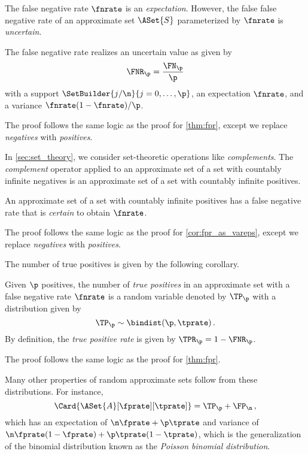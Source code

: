 \documentclass[ ../main.tex]{subfiles}
\begin{document}
The false negative rate $\fnrate$ is an \emph{expectation}.
However, the false false negative rate of an approximate set $\ASet{S}$ parameterized by $\fnrate$ is \emph{uncertain}.
\begin{theorem}
\label{thm:fnr}
The false negative rate realizes an uncertain value as given by
\begin{equation}
    \FNR_\p = \frac{\FN_\p}{\p}
\end{equation}
with a support $\SetBuilder{j / \n}{j = 0,\ldots,\p}$, an expectation 
$\fnrate$, 
and a variance $\fnrate(1-\fnrate) / \p$.
\end{theorem}
The proof follows the same logic as the proof for \cref{thm:fpr}, except we 
replace \emph{negatives} with \emph{positives}.

In \cref{sec:set_theory}, we consider set-theoretic operations like 
\emph{complements}. The \emph{complement} operator applied to an approximate 
set 
of a set with countably infinite negatives is an approximate set of a set with 
countably infinite positives.
\begin{corollary}
An approximate set of a set with countably infinite positives has a false 
negative rate that is \emph{certain} to obtain $\fnrate$.
\end{corollary}
The proof follows the same logic as the proof for \cref{cor:fpr_as_vareps}, 
except we replace \emph{negatives} with \emph{positives}.

The number of true positives is given by the following corollary.
\begin{corollary}
\label{cor:tpbinom}
Given $\p$ positives, the number of \emph{true positives} in an approximate set 
with a false negative rate $\fnrate$ is a random variable denoted by $\TP_\p$
with a distribution given by 
\begin{equation}
    \TP_\p \sim \bindist(\p, \tprate)\,.
\end{equation}
By definition, the \emph{true positive rate} is given by $\TPR_\p = 1 - 
\FNR_\p$.
\end{corollary}
The proof follows the same logic as the proof for \cref{thm:fpr}.

Many other properties of random approximate sets follow from these distributions.
For instance,
\begin{equation}
	\Card{\ASet{A}[\fprate][\tprate]} = \TP_\p + \FP_\n\,,
\end{equation}
which has an expectation of $\n \fprate + \p \tprate$ and variance of $\n \fprate(1-\fprate) + \p \tprate(1-\tprate)$, which is the generalization of the binomial distribution known as the \emph{Poisson binomial distribution}.
\end{document}
